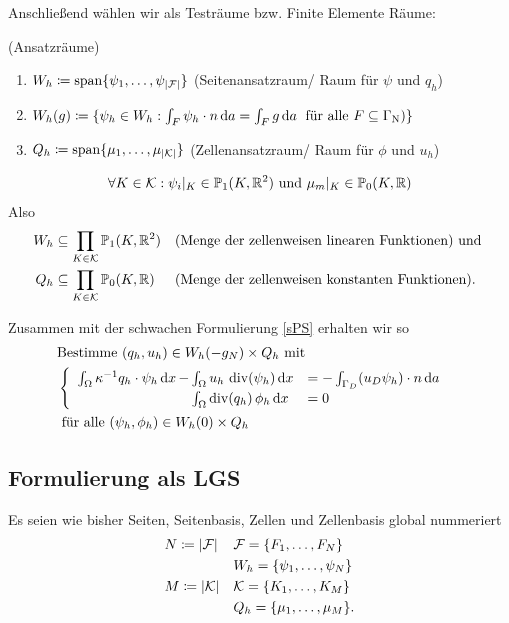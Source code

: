 Anschließend wählen wir als Testräume bzw. Finite Elemente Räume:
\begin{Definition}(Ansatzräume)
	\begin{enumerate}[label=(\alph*)]
		\item $ W_h \coloneqq \operatorname{span} \{ \psi_1,\dots,\psi_{|\mathcal{F}|}\}$ (Seitenansatzraum/ Raum für $ \psi $ und $ q_h $)
		\item $ W_h(g) \coloneqq \{ \psi_h \in W_h:  \int_F \psi_h \cdot n \, \mathrm{d} a = \int_F g \, \mathrm{d} a \; \text{ für alle } F \subseteq \Gamma_{\text{N}})  \}$
		\item $ Q_h \coloneqq \operatorname{span} \{ \mu_1, \dots, \mu_{|\mathcal{K}|} \} $ (Zellenansatzraum/ Raum für $\phi $ und $ u_h $)
	\end{enumerate}
\end{Definition}

\begin{Bemerkung}
	
	\[	\forall K \in \mathcal{K}:\psi_i|_K \in \mathbb{P}_1(K,\mathbb{R}^2) \text{ und } \mu_m|_K \in \mathbb{P}_0(K,\mathbb{R}) \]
	Also
	\begin{align*}	
	W_h &\subseteq \prod_{K \in \mathcal{K}} \mathbb{P}_1(K,\mathbb{R}^2) &&\text{(Menge der zellenweisen linearen Funktionen) und }\\
	Q_h &\subseteq \prod_{K \in \mathcal{K}} \mathbb{P}_0(K,\mathbb{R}) &&\text{(Menge der zellenweisen konstanten Funktionen)}. 
	\end{align*}	
\end{Bemerkung}

Zusammen mit der schwachen Formulierung \eqref{sPS} erhalten wir so
\begin{align*}
&\text{Bestimme } (q_h,u_h) \in W_h(-g_N) \times Q_h \text{ mit}\\
&\begin{cases}
\begin{array}{llll}
\int_{\Omega} \kappa^{-1} q_h \cdot \psi_h \, \mathrm{d} x \, - \mkern-15mu &\int_{\Omega} u_h \, \operatorname{div}(\psi_h) \, \mathrm{d} x &= - \int_{\Gamma_D} (u_D \psi_h) \cdot n \, \mathrm{d} a\\
&\int_{\Omega} \operatorname{div}(q_h) \, \phi_h \, \mathrm{d} x &= 0
\end{array}
\end{cases}	\\
&\text{ für alle } (\psi_h, \phi_h) \in W_h(0) \times Q_h
\end{align*} 




\subsection{Formulierung als LGS}
Es seien wie bisher Seiten, Seitenbasis, Zellen und Zellenbasis global nummeriert 
\begin{align*}
&N \coloneqq | \mathcal{F} | &&\mathcal{F} = \{F_1, \dots , F_{N} \}  \\
&&&W_h =\{\psi_1, \dots , \psi_N\}\\
&M \coloneqq | \mathcal{K} | &&\mathcal{K} = \{K_1, \dots , K_{M} \}  \\
&&&Q_h = \{\mu_1 , \dots , \mu_M  \}.
\end{align*}


